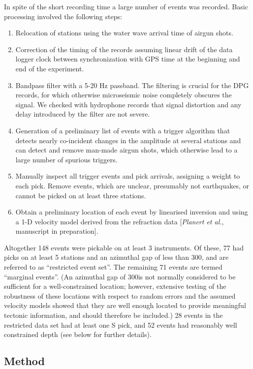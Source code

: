 \documentclass[jgr]{aguplus}
\newlength{\tw}
\begin{document}
\begin{article}
 In spite of the short recording time a large number of events was
recorded. Basic processing involved the following steps:
\begin{enumerate}
\item Relocation of stations using the water wave arrival time of
airgun shots.
\item
Correction of the timing of the records assuming  linear drift
of the data logger clock between synchronization with GPS time at the
beginning and end of the experiment.
\item Bandpass filter with a 5-20 Hz passband.  The
filtering is crucial for the DPG records, for which otherwise
microseismic noise completely obscures the signal. We checked with
hydrophone records that signal distortion and any delay introduced by
the filter are not severe.
\item Generation of  a preliminary list of events
with a trigger algorithm that  detects nearly
co-incident changes in the amplitude at several stations and can
detect and remove man-made airgun shots, which otherwise lead to a
large number of spurious triggers.
\item Manually inspect all trigger events and pick arrivals, assigning
a weight to each pick. Remove
events, which are unclear, presumably not earthquakes, or cannot be
picked on at least three stations.
\item Obtain a preliminary location of each event by linearised
inversion and using a 1-D velocity model derived from the refraction
data [{\it Planert et al.}, manuscript in preparation].
\end{enumerate}
Altogether 148 events were pickable on at least 3 instruments. Of
these, 77 had picks on at least 5 stations and an azimuthal gap of
less than 300\dg, and are referred to as ``restricted event set''. The
remaining 71 events are termed ``marginal events''. (An azimuthal gap
of 300\dg is not normally considered to be sufficient for a
well-constrained location; however, extensive testing of the
robustness of these locations with respect to random errors and the
assumed velocity models showed that they are well enough located to
provide meaningful tectonic information, and should therefore be included.)
28 events in the
restricted data set
 had at least one S pick, and 52 events had reasonably well
constrained depth (see below for further details).

\subsection{Method}


\end{article}
\end{document}
